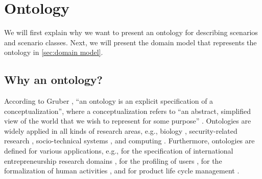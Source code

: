\section{Ontology}
\label{sec:ontology}

\cbstart
We will first explain why we want to present an ontology for describing scenarios and scenario classes. Next, we will present the domain model that represents the ontology in \cref{sec:domain model}.

\subsection{Why an ontology?}
\label{sec:why ontology}
According to Gruber \cite{gruber1993ontology}, ``an ontology is an explicit specification of a conceptualization'', where a conceptualization refers to ``an abstract, simplified view of the world that we wish to represent for some purpose'' \cite{gruber1993ontology}. Ontologies are widely applied in all kinds of research areas, e.g., biology \cite{gkoutos2004mouse}, security-related research \cite{kim2005security}, socio-technical systems \cite{vanDamPhDThesis2009}, and computing \cite{chen2004soupa,chen2003ontology}. Furthermore, ontologies are defined for various applications, e.g., for the specification of international entrepreneurship research domains \cite{jones2011international}, for the profiling of users \cite{golemati2007creating}, for the formalization of human activities \cite{lee2017location}, and for product life cycle management \cite{matsokis2010plm}.


